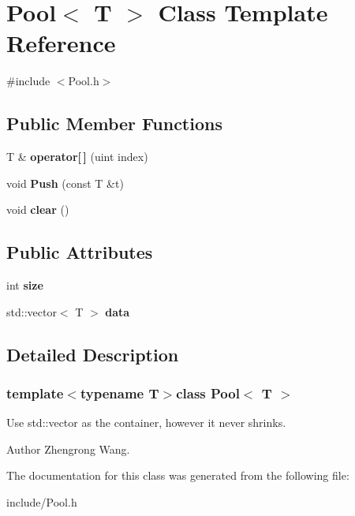 \hypertarget{classPool}{}\section{Pool$<$ T $>$ Class Template Reference}
\label{classPool}


{\ttfamily \#include $<$Pool.\+h$>$}

\subsection*{Public Member Functions}
\begin{DoxyCompactItemize}
\item 
\hypertarget{classPool_ac4076ad218acab283dacc29e8e2cf855}{}T \& {\bfseries operator\mbox{[}$\,$\mbox{]}} (uint index)\label{classPool_ac4076ad218acab283dacc29e8e2cf855}

\item 
\hypertarget{classPool_acbec03f17980c373ecf27ed2db420d7b}{}void {\bfseries Push} (const T \&t)\label{classPool_acbec03f17980c373ecf27ed2db420d7b}

\item 
\hypertarget{classPool_aae8e8528b907d7339af05685ba49aa92}{}void {\bfseries clear} ()\label{classPool_aae8e8528b907d7339af05685ba49aa92}

\end{DoxyCompactItemize}
\subsection*{Public Attributes}
\begin{DoxyCompactItemize}
\item 
\hypertarget{classPool_a2c33796e829a9c6d536a85b7ad62d309}{}int {\bfseries size}\label{classPool_a2c33796e829a9c6d536a85b7ad62d309}

\item 
\hypertarget{classPool_a9a3a4597a8e96a97b2186f972104f196}{}std\+::vector$<$ T $>$ {\bfseries data}\label{classPool_a9a3a4597a8e96a97b2186f972104f196}

\end{DoxyCompactItemize}


\subsection{Detailed Description}
\subsubsection*{template$<$typename T$>$class Pool$<$ T $>$}

Use std\+::vector as the container, however it never shrinks. \begin{DoxyAuthor}{Author}
Zhengrong Wang. 
\end{DoxyAuthor}


The documentation for this class was generated from the following file\+:\begin{DoxyCompactItemize}
\item 
include/Pool.\+h\end{DoxyCompactItemize}

